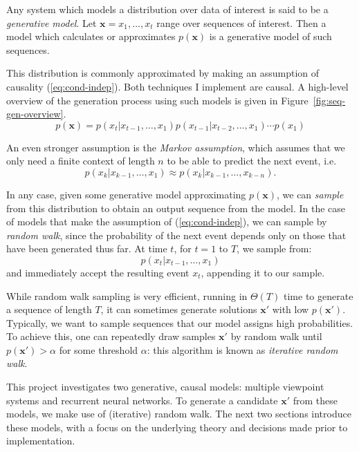 \documentclass[12pt,a4paper,twoside,openright]{report}
\newcommand{\vect}[1]{\boldsymbol{\mathbf{#1}}}
\begin{document}
Any system which models a distribution over data of interest is said to be a
\emph{generative model}. Let $\vect{x} = x_1, \ldots, x_t$ range over sequences
of interest. Then a model which calculates or approximates $p(\vect{x})$ is a
generative model of such sequences.

This distribution is commonly approximated by making an assumption of causality
(\ref{eq:cond-indep}). Both techniques I implement are causal. A high-level
overview of the generation process using such models is given in
Figure~\ref{fig:seq-gen-overview}.
\begin{equation}
  p(\vect{x}) = p(x_t | x_{t-1}, \ldots, x_1) p(x_{t-1} | x_{t-2},
  \ldots, x_1) \cdots p(x_1) \label{eq:cond-indep}
\end{equation} 

An even stronger assumption is the \emph{Markov assumption}, which assumes that
we only need a finite context of length $n$ to be able to predict the next
event, i.e.
\begin{equation}
  p(x_k | x_{k-1}, \ldots, x_1) \approx p(x_k | x_{k-1}, \ldots, x_{k-n}).
  \label{eq:markov-asmptn}
\end{equation} 

In any case, given some generative model approximating $p(\vect{x})$, we can
\emph{sample} from this distribution to obtain an output sequence from the
model. In the case of models that make the assumption of (\ref{eq:cond-indep}),
we can sample by \emph{random walk}, since the probability of the next event
depends only on those that have been generated thus far. At time $t$, for $t =
1$ to $T$, we sample from:
$$ p(x_t | x_{t-1}, \ldots, x_1) $$
and immediately accept the resulting event $x_t$, appending it to our sample.

While random walk sampling is very efficient, running in $\Theta(T)$ time to
generate a sequence of length $T$, it can sometimes generate solutions
$\vect{x}'$ with low $p(\vect{x}')$. Typically, we want to sample sequences that
our model assigns high probabilities. To achieve this, one can 
repeatedly draw samples $\vect{x}'$ by random walk until $p(\vect{x}') > \alpha$
for some threshold $\alpha$: this algorithm is known as \emph{iterative random
walk}.

This project investigates two generative, causal models: multiple viewpoint
systems and recurrent neural networks. To generate a candidate $\vect{x}'$ from
these models, we make use of (iterative) random walk. The next two sections
introduce these models, with a focus on the underlying theory and decisions made
prior to implementation.
\end{document}
